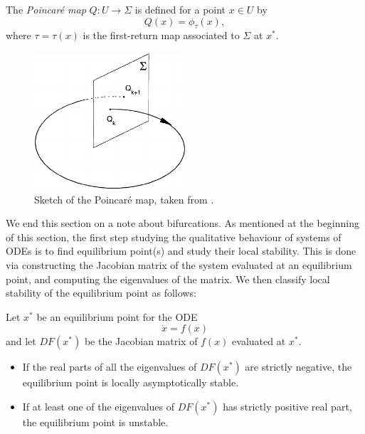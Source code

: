 \documentclass[12pt]{UOthesis}
\theoremstyle{remarkstyle}
\begin{document}
\begin{defn}
	The \emph{Poincar\'e map} $Q\colon U\rightarrow\Sigma$ is defined for a point $x\in U$ by
	\begin{equation}
	Q(x)=\phi_\tau (x),
	\label{PoincareMap}
	\end{equation}
	where $\tau=\tau(x)$ is the first-return map associated to $\Sigma$ at $x^*$.
	\label{DefPoincareMap}
\end{defn}

\begin{figure}[h!]
	\centering
	\includegraphics[width=0.5\textwidth]{PoincareMapSketch.png}
	\caption[Sketch of Poincar\'e map]{Sketch of the Poincar\'e map, taken from \cite{Abdullaev}.\label{PoincareMapSketch}}
\end{figure}

We end this section on a note about bifurcations. As mentioned at the beginning of this section, the first step studying the qualitative behaviour of systems of ODEs is to find equilibrium point(s) and study their local stability. This is done via constructing the Jacobian matrix of the system evaluated at an equilibrium point, and computing the eigenvalues of the matrix. We then classify local stability of the equilibrium point as follows:

\begin{prop}
	Let $x^*$ be an equilibrium point for the ODE
	$$\dot{x}=f(x)$$
	and let $DF(x^*)$ be the Jacobian matrix of $f(x)$ evaluated at $x^*$.
	\begin{itemize}
		\item If the real parts of all the eigenvalues of $DF(x^*)$ are strictly negative, the equilibrium point is locally asymptotically stable.
		\item If at least one of the eigenvalues of $DF(x^*)$ has strictly positive real part, the equilibrium point is unstable.
	\end{itemize}
\label{PropLocalStability}
\end{prop}
\end{document}
